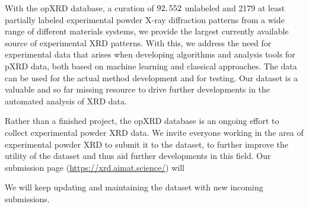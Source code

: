 With the opXRD database, a curation of $92,552$ unlabeled and 2179 at least partially labeled experimental powder X-ray diffraction patterns from a wide range of different materials systems, we provide the largest currently available source of experimental XRD patterns. With this, we address the need for experimental data that arises when developing algorithms and analysis tools for pXRD data, both based on machine learning and classical approaches. The data can be used for the actual method development and for testing. Our dataset is a valuable and so far missing resource to drive further developments in the automated analysis of XRD data. 

Rather than a finished project, the opXRD database is an ongoing effort to collect experimental powder XRD data. We invite everyone  working in the area of experimental powder XRD to submit it to the dataset,  to further improve the utility of the dataset and thus aid further developments in this field. Our submission page (\url{https://xrd.aimat.science/})  will  

We will keep updating and maintaining the dataset with new incoming submissions.
